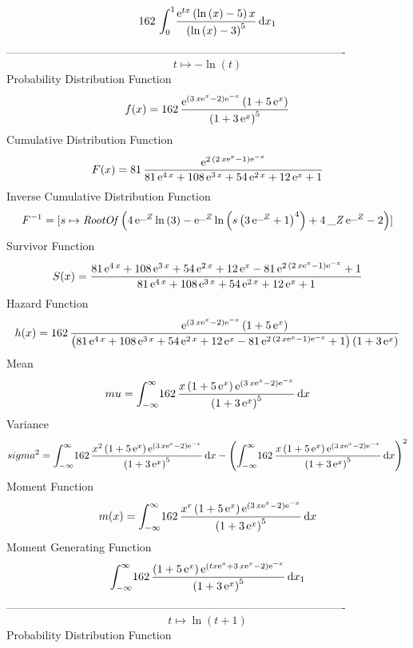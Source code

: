 \documentclass[12pt]{article}
\begin{document}
 $$162\,\int_{0}^{1}\!{\frac {{{\rm e}^{tx}} \left( \ln  \left( x
 \right) -5 \right) x}{ \left( \ln  \left( x \right) -3 \right) ^{5}}}
\,{\rm d}x_{{1}}
$$-------------------------------------------------------------------------------------------  \\$$t\mapsto -\ln  \left( t \right) 
$$Probability Distribution Function 
$$  f(x)=162\,{\frac {{{\rm e}^{ \left( 3\,x{{\rm e}^{x}}-2 \right) {{\rm e}^{-
x}}}} \left( 1+5\,{{\rm e}^{x}} \right) }{ \left( 1+3\,{{\rm e}^{x}}
 \right) ^{5}}}
$$Cumulative Distribution Function  
 $$F(x)=81\,{\frac {{{\rm e}^{2\, \left( 2\,x{{\rm e}^{x}}-1 \right) {{\rm e}^
{-x}}}}}{81\,{{\rm e}^{4\,x}}+108\,{{\rm e}^{3\,x}}+54\,{{\rm e}^{2\,x
}}+12\,{{\rm e}^{x}}+1}}
$$ Inverse Cumulative Distribution Function 
  $$F^{-1} = [s\mapsto {\it RootOf} \left( 4\,{{\rm e}^{{\it \_Z}}}\ln  \left( 3
 \right) -{{\rm e}^{{\it \_Z}}}\ln  \left( s \left( 3\,{{\rm e}^{{\it 
\_Z}}}+1 \right) ^{4} \right) +4\,{\it \_Z}\,{{\rm e}^{{\it \_Z}}}-2
 \right) ]
$$Survivor Function 
 $$ S(x)={\frac {81\,{{\rm e}^{4\,x}}+108\,{{\rm e}^{3\,x}}+54\,{{\rm e}^{2\,x}
}+12\,{{\rm e}^{x}}-81\,{{\rm e}^{2\, \left( 2\,x{{\rm e}^{x}}-1
 \right) {{\rm e}^{-x}}}}+1}{81\,{{\rm e}^{4\,x}}+108\,{{\rm e}^{3\,x}
}+54\,{{\rm e}^{2\,x}}+12\,{{\rm e}^{x}}+1}}
$$ Hazard Function 
 $$ h(x)=162\,{\frac {{{\rm e}^{ \left( 3\,x{{\rm e}^{x}}-2 \right) {{\rm e}^{-
x}}}} \left( 1+5\,{{\rm e}^{x}} \right) }{ \left( 81\,{{\rm e}^{4\,x}}
+108\,{{\rm e}^{3\,x}}+54\,{{\rm e}^{2\,x}}+12\,{{\rm e}^{x}}-81\,{
{\rm e}^{2\, \left( 2\,x{{\rm e}^{x}}-1 \right) {{\rm e}^{-x}}}}+1
 \right)  \left( 1+3\,{{\rm e}^{x}} \right) }}
$$Mean 
 $$ mu=\int_{-\infty }^{\infty }\!162\,{\frac {x \left( 1+5\,{{\rm e}^{x}}
 \right) {{\rm e}^{ \left( 3\,x{{\rm e}^{x}}-2 \right) {{\rm e}^{-x}}}
}}{ \left( 1+3\,{{\rm e}^{x}} \right) ^{5}}}\,{\rm d}x
$$ Variance 
 $$ sigma^2 = \int_{-\infty }^{\infty }\!162\,{\frac {{x}^{2} \left( 1+5\,{{\rm e}^{
x}} \right) {{\rm e}^{ \left( 3\,x{{\rm e}^{x}}-2 \right) {{\rm e}^{-x
}}}}}{ \left( 1+3\,{{\rm e}^{x}} \right) ^{5}}}\,{\rm d}x- \left( 
\int_{-\infty }^{\infty }\!162\,{\frac {x \left( 1+5\,{{\rm e}^{x}}
 \right) {{\rm e}^{ \left( 3\,x{{\rm e}^{x}}-2 \right) {{\rm e}^{-x}}}
}}{ \left( 1+3\,{{\rm e}^{x}} \right) ^{5}}}\,{\rm d}x \right) ^{2}
$$Moment Function 
 $$ m(x) = \int_{-\infty }^{\infty }\!162\,{\frac {{x}^{r} \left( 1+5\,{{\rm e}^{
x}} \right) {{\rm e}^{ \left( 3\,x{{\rm e}^{x}}-2 \right) {{\rm e}^{-x
}}}}}{ \left( 1+3\,{{\rm e}^{x}} \right) ^{5}}}\,{\rm d}x
$$ Moment Generating Function 
 $$\int_{-\infty }^{\infty }\!162\,{\frac { \left( 1+5\,{{\rm e}^{x}}
 \right) {{\rm e}^{ \left( tx{{\rm e}^{x}}+3\,x{{\rm e}^{x}}-2
 \right) {{\rm e}^{-x}}}}}{ \left( 1+3\,{{\rm e}^{x}} \right) ^{5}}}
\,{\rm d}x_{{1}}
$$-------------------------------------------------------------------------------------------  \\$$t\mapsto \ln  \left( t+1 \right) 
$$Probability Distribution Function 
\end{document}
